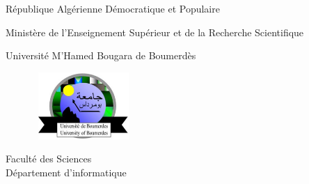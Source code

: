 \documentclass[12pt]{report}
\begin{document}
\begin{titlepage}


   \begin{center}
       \vspace*{-0.4in}

       \begin{large}

           République Algérienne Démocratique et Populaire

           Ministère de l'Enseignement Supérieur et de la Recherche Scientifique

           Université M'Hamed Bougara de Boumerdès

       \end{large}

       \vspace{0.1in}


    \begin{figure}[h]
    \centering
        \includegraphics[width = 1.5in, height = 1in]{../Images/UnivUMBB.jpg}
    \end{figure}
     \vspace*{-0.1in}
    \large{Faculté des Sciences}
    \\
    \vspace*{-0.1in}
    \large{Département d'informatique}
   \end{center}


\end{titlepage}
\end{document}
